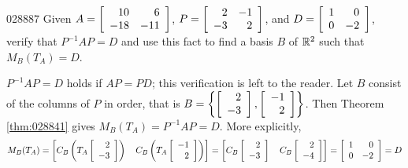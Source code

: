 \begin{example}{}{028887}
Given $A = \left[ \begin{array}{rr} 10 & 6 \\ -18 & -11 \end{array} \right]$, $P = \left[ \begin{array}{rr} 2 & -1 \\ -3 & 2 \end{array} \right]$, and $D = \left[ \begin{array}{rr} 1 & 0 \\ 0 & -2 \end{array} \right]$, verify that $P^{-1}AP = D$ and use this fact to find a basis $B$ of $\mathbb{R}^2$ such that $M_{B}(T_{A}) = D$.


\begin{solution}
$P^{-1}AP = D$ holds if $AP = PD$; this verification is left to the reader. Let $B$ consist of the columns of $P$ in order, that is $B = \left\{ \left[ \begin{array}{r} 2 \\ -3 \end{array} \right], \left[ \begin{array}{r} -1 \\ 2 \end{array} \right] \right\}$. Then Theorem \ref{thm:028841} gives $M_{B}(T_{A}) = P^{-1}AP = D$. More explicitly,
\begin{equation*}
M_B(T_A) = \left[ C_B \left( T_A  \left[ \begin{array}{r} 2 \\ -3 \end{array} \right] \right) \quad C_B \left( T_A \left[ \begin{array}{r} -1 \\ 2 \end{array} \right] \right) \right] = \left[ C_B \left[ \begin{array}{r} 2 \\ -3 \end{array} \right] \quad C_B \left[ \begin{array}{r} 2 \\ -4 \end{array} \right] \right] = \left[ \begin{array}{rr} 1 & 0 \\ 0 & -2 \end{array} \right] = D
\end{equation*}
\end{solution}
\end{example}

